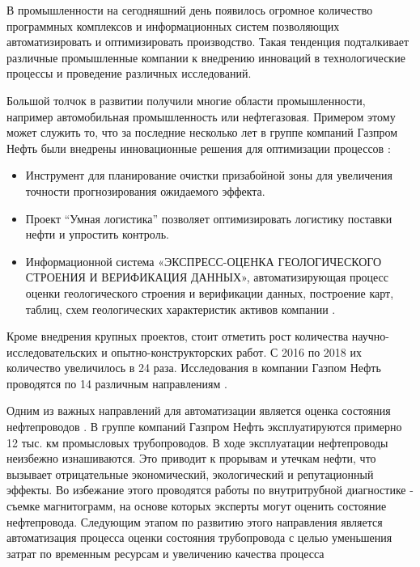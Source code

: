 \documentclass[a4paper,article,14pt]{extarticle}
\begin{document}


\tableofcontents
\pagebreak

В промышленности на сегодняшний день появилось огромное количество программных комплексов и 
информационных систем позволяющих автоматизировать и оптимизировать производство. 
Такая тенденция подталкивает различные промышленные компании к внедрению инноваций 
в технологические процессы и проведение различных исследований. 

Большой толчок в развитии получили многие области промышленности, например автомобильная промышленность или нефтегазовая. 
Примером этому может служить то, что за последние несколько лет в группе компаний Газпром Нефть были 
внедрены инновационные решения для оптимизации процессов \cite{j1}:
\begin{itemize}
    \item Инструмент для планирование очистки призабойной зоны для увеличения точности прогнозирования ожидаемого эффекта.
    \item Проект “Умная логистика” позволяет оптимизировать логистику поставки нефти и упростить контроль.
    \item Информационной система «ЭКСПРЕСС-ОЦЕНКА ГЕОЛОГИЧЕСКОГО СТРОЕНИЯ И ВЕРИФИКАЦИЯ ДАННЫХ», 
    автоматизирующая процесс оценки геологического строения и верификации данных, построение карт, 
    таблиц, схем геологических характеристик активов компании \cite{s1}. 	
\end{itemize}

Кроме внедрения крупных проектов, стоит отметить рост количества научно-исследовательских и опытно-конструкторских работ. 
С 2016 по 2018 их количество увеличилось в 24 раза. Исследования в компании 
Газпом Нефть проводятся по 14 различным направлениям \cite{j2}.

Одним из важных направлений для автоматизации является оценка состояния нефтепроводов \cite{a1}.
В группе компаний Газпром Нефть эксплуатируются примерно 12 тыс. км промысловых трубопроводов. В ходе эксплуатации нефтепроводы неизбежно изнашиваются. 
Это приводит к прорывам и утечкам нефти, что вызывает отрицательные экономический, экологический и репутационный эффекты. 
Во избежание этого проводятся работы по внутритрубной диагностике - съемке магнитограмм, на основе которых эксперты могут оценить состояние нефтепровода. 
Следующим этапом по развитию этого направления является автоматизация процесса оценки состояния трубопровода 
с целью уменьшения затрат по временным ресурсам и увеличению качества процесса
\end{document}
